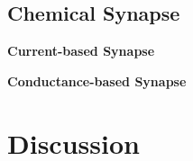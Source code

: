 \subsection{Chemical Synapse}

 \textbf{Current-based Synapse}


\textbf{Conductance-based Synapse}


\section{Discussion}


